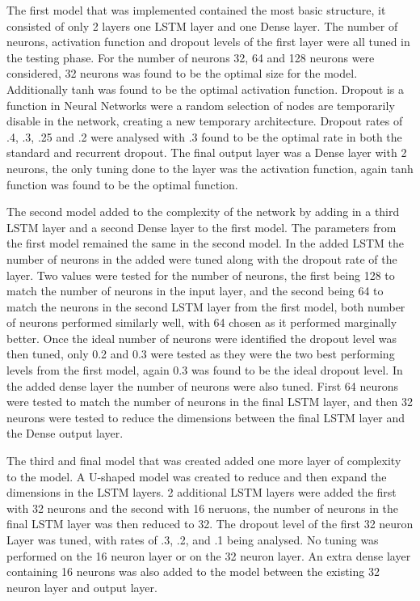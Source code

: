 \documentclass{imc-inf}
\begin{document}
	The first model that was implemented contained the most basic structure, it consisted of only 2 layers one LSTM layer and one Dense layer. The number of neurons, activation function and dropout levels of the first layer were all tuned in the testing phase. For the number of neurons 32, 64 and 128 neurons were considered, 32 neurons was found to be the optimal size for the model. Additionally tanh was found to be the optimal activation function. Dropout is a function in Neural Networks were a random selection of nodes are temporarily disable in the network, creating a new temporary architecture. Dropout rates of .4, .3, .25 and .2  were analysed with .3 found to be the optimal rate in both the standard and recurrent dropout.  The final output layer was a Dense layer with 2 neurons, the only tuning done to the layer was the activation function, again tanh function was found to be the optimal function.
	\newline
	
	The second model added to the complexity of the network by adding in a third LSTM layer and a second Dense layer to the first model. The parameters from the first model remained the same in the second model. In the added LSTM the number of neurons in the added were tuned along with the dropout rate of the layer. Two values were tested for the number of neurons, the first being 128 to match the number of neurons in the input layer, and the second being 64 to match the neurons in the second LSTM layer from the first model, both number of neurons performed similarly well, with 64 chosen as it performed marginally better. Once the ideal number of neurons were identified the dropout level was then tuned, only 0.2 and 0.3 were tested as they were the two best performing levels from the first model, again 0.3 was found to be the ideal dropout level. In the added dense layer the number of neurons were also tuned. First 64 neurons were tested to match the number of neurons in the final LSTM layer, and then 32 neurons were tested to reduce the dimensions between the final LSTM layer and the Dense output layer. 
	\newline
	
	The third and final model that was created added one more layer of complexity to the model. A U-shaped model was created to reduce and then expand the dimensions in the LSTM layers. 2 additional LSTM layers were added the first with 32 neurons and the second with 16 neruons, the number of neurons in the final LSTM layer was then reduced to 32. The dropout level of the first 32 neuron Layer was tuned, with rates of .3, .2, and .1 being analysed. No tuning was performed on the 16 neuron layer or on the 32 neuron layer. An extra dense layer containing 16 neurons was also added to the model between the existing 32 neuron layer and output layer.
	\newline
	
\end{document}
